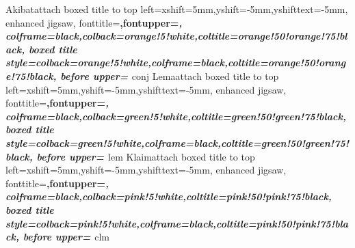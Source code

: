 %
{Akibat}{attach boxed title to top 	left={xshift=5mm,yshift=-5mm,yshifttext=-5mm},
	enhanced jigsaw,
	fonttitle=\bfseries\large,fontupper=\slshape,
	colframe=black,colback=orange!5!white,coltitle=orange!50!orange!75!black,
	boxed title style={colback=orange!5!white,colframe=black,coltitle=orange!50!orange!75!black},
	before upper={
		}
}{conj}%
%
{Lema}{attach boxed title to top 	left={xshift=5mm,yshift=-5mm,yshifttext=-5mm},
	enhanced jigsaw,
	fonttitle=\bfseries\large,fontupper=\itshape,
	colframe=black,colback=green!5!white,coltitle=green!50!green!75!black,
	boxed title style={colback=green!5!white,colframe=black,coltitle=green!50!green!75!black},
	before upper={
		}
}{lem}%
%
{Klaim}{attach boxed title to top 	left={xshift=5mm,yshift=-5mm,yshifttext=-5mm},
	enhanced jigsaw,
	fonttitle=\bfseries\large,fontupper=\itshape,
	colframe=black,colback=pink!5!white,coltitle=pink!50!pink!75!black,
	boxed title style={colback=pink!5!white,colframe=black,coltitle=pink!50!pink!75!black},
	before upper={
		}
}{clm}%
